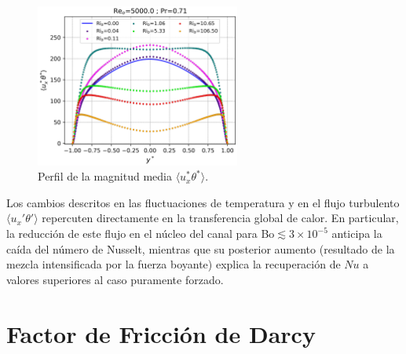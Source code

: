 \begin{figure}[H] %
  \centering
  \includegraphics[width=0.6\textwidth]{figures/cap5/Re5000-Pr071/uxphi_profile.png}  
  \caption{Perfil de la magnitud media $\langle u^{*}_x\theta^{*}\rangle$.}
  \label{fig:uphi-Re5000-Pr071}
\end{figure}



Los cambios descritos en las fluctuaciones de temperatura y en el flujo turbulento $\langle u_x'\theta'\rangle$ repercuten directamente en la transferencia global de calor. En particular, la reducción de este flujo en el núcleo del canal para Bo$\lesssim3\times10^{-5}$ anticipa la caída del número de Nusselt, mientras que su posterior aumento (resultado de la mezcla intensificada por la fuerza boyante) explica la recuperación de $Nu$ a valores superiores al caso puramente forzado.




\newpage
\section{Factor de Fricción de Darcy}

